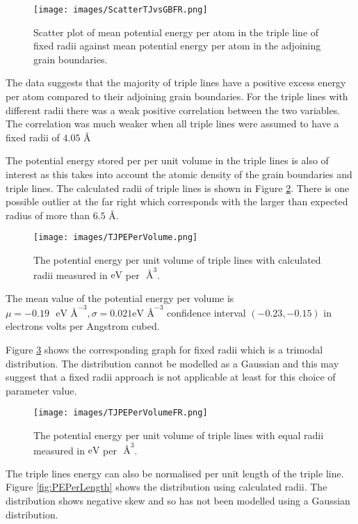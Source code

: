 \documentclass[12pt,a4paper,openany]{report}
\newcommand{\ts}[1]{\textrm{#1}}
\begin{document}
\begin{figure}[H]
	\texttt{[image: images/ScatterTJvsGBFR.png]} 
	\caption{Scatter plot of mean potential energy per atom in the triple line of fixed radii against mean potential energy per atom in the adjoining grain boundaries.}
	\label{fig:ScatterTJvsGBFR}
\end{figure}

The data suggests that the majority of triple lines have a positive excess energy per atom compared to their adjoining grain boundaries. For the triple lines with different radii there was a weak positive correlation between the two variables. The correlation was much weaker when all triple lines were assumed to have a fixed radii of $4.05 \textrm{ \AA}$ 

The potential energy stored per per unit volume in the triple lines is also of interest as this takes into account the atomic density of the grain boundaries and triple lines. The calculated radii of triple lines is shown in Figure \ref{fig:PEPerVol}. There is one possible outlier at the far right which corresponds with the larger than expected radius of more than $6.5 \textrm{ \AA}$. 

\begin{figure}[H]
	\texttt{[image: images/TJPEPerVolume.png]} 
	\caption{The potential energy per unit volume of triple lines with calculated radii measured in $\ts{eV}$ per $\textrm{ \AA}^3$.}	
	\label{fig:PEPerVol}
\end{figure}
The mean value of the potential energy per volume is $\mu = -0.19 \text{ } \ts{eV} \textrm{ \AA}^{-3}, \sigma = 0.021 \ts{eV} \textrm{ \AA}^{-3}$ confidence interval $(-0.23, -0.15)$ in electrons volts per Angstrom cubed.

Figure \ref{fig:PEPerVolFR} shows the corresponding graph for fixed radii which is a trimodal distribution. The distribution cannot be modelled as a Gaussian and this may suggest that a fixed radii approach is not applicable at least for this choice of parameter value.

\begin{figure}
	\texttt{[image: images/TJPEPerVolumeFR.png]} 
		\caption{The potential energy per unit volume of triple lines with equal radii measured in $\ts{eV}$ per $\textrm{ \AA}^3$.}	
	\label{fig:PEPerVolFR}
\end{figure}

\newpage
The triple lines energy can also be normalised per unit length of the triple line. Figure \ref{fig:PEPerLength} shows the distribution using calculated radii. The distribution shows negative skew and so has not been modelled using a Gaussian distribution.   
\end{document}
